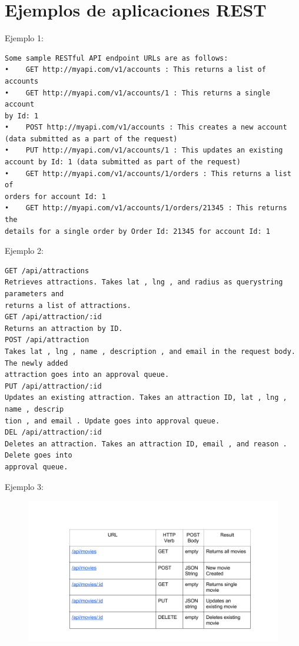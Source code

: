 \documentclass[4paper]{article}
\begin{document}
\section{Ejemplos de aplicaciones REST}
Ejemplo 1:
\begin{verbatim}
Some sample RESTful API endpoint URLs are as follows:
•	 GET http://myapi.com/v1/accounts : This returns a list of accounts
•	 GET http://myapi.com/v1/accounts/1 : This returns a single account
by Id: 1
•	 POST http://myapi.com/v1/accounts : This creates a new account
(data submitted as a part of the request)
•	 PUT http://myapi.com/v1/accounts/1 : This updates an existing
account by Id: 1 (data submitted as part of the request)
•	 GET http://myapi.com/v1/accounts/1/orders : This returns a list of
orders for account Id: 1
•	 GET http://myapi.com/v1/accounts/1/orders/21345 : This returns the
details for a single order by Order Id: 21345 for account Id: 1
\end{verbatim}
\newpage
Ejemplo 2:
\begin{verbatim}
GET /api/attractions
Retrieves attractions. Takes lat , lng , and radius as querystring parameters and
returns a list of attractions.
GET /api/attraction/:id
Returns an attraction by ID.
POST /api/attraction
Takes lat , lng , name , description , and email in the request body. The newly added
attraction goes into an approval queue.
PUT /api/attraction/:id
Updates an existing attraction. Takes an attraction ID, lat , lng , name , descrip
tion , and email . Update goes into approval queue.
DEL /api/attraction/:id
Deletes an attraction. Takes an attraction ID, email , and reason . Delete goes into
approval queue.
\end{verbatim}
Ejemplo 3:
\begin{figure}[H]
\includegraphics[scale=0.45]{../imagenes/api_rest1.png}
\end{figure}
\end{document}
